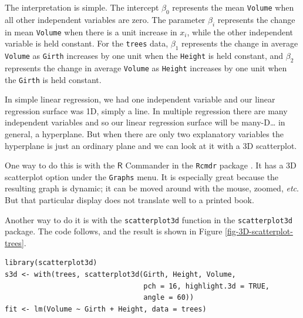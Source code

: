 \documentclass[captions=tableheading]{scrbook}
\begin{document}
The interpretation is simple. The intercept \(\beta_{0}\) represents the mean \texttt{Volume} when all other independent variables are zero. The parameter \(\beta_{i}\) represents the change in mean \texttt{Volume} when there is a unit increase in \(x_{i}\), while the other independent variable is held constant. For the \texttt{trees} data, \(\beta_{1}\) represents the change in average \texttt{Volume} as \texttt{Girth} increases by one unit when the \texttt{Height} is held constant, and \(\beta_{2}\) represents the change in average \texttt{Volume} as \texttt{Height} increases by one unit when the \texttt{Girth} is held constant. 


In simple linear regression, we had one independent variable and our linear regression surface was 1D, simply a line. In multiple regression there are many independent variables and so our linear regression surface will be many-D\ldots{} in general, a hyperplane. But when there are only two explanatory variables the hyperplane is just an ordinary plane and we can look at it with a 3D scatterplot. 

One way to do this is with the \(\mathsf{R}\) Commander in the \texttt{Rcmdr} package \cite{Foxrcmdr}. It has a 3D scatterplot option under the \texttt{Graphs} menu. It is especially great because the resulting graph is dynamic; it can be moved around with the mouse, zoomed, \emph{etc}. But that particular display does not translate well to a printed book.

Another way to do it is with the \texttt{scatterplot3d} function in the \texttt{scatterplot3d} package. The code follows, and the result is shown in Figure \ref{fig-3D-scatterplot-trees}.


\lstset{language=R}
\begin{lstlisting}
library(scatterplot3d)
s3d <- with(trees, scatterplot3d(Girth, Height, Volume, 
                                 pch = 16, highlight.3d = TRUE, 
                                 angle = 60))
fit <- lm(Volume ~ Girth + Height, data = trees)
\end{lstlisting}
\end{document}
